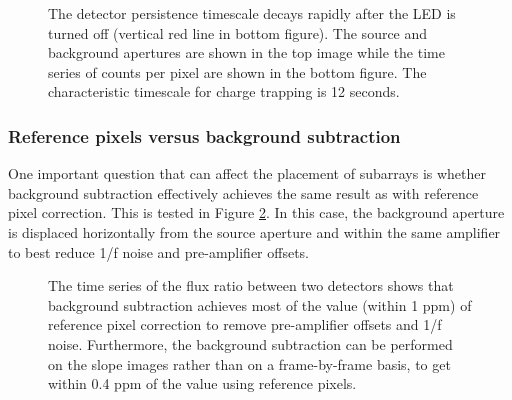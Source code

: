 \documentclass{aastex62}
\begin{document}
\begin{figure}
{}
{}
\caption{The detector persistence timescale decays rapidly after the LED is turned off (vertical red line in bottom figure).
The source and background apertures are shown in the top image while the time series of counts per pixel are shown in the bottom figure.
The characteristic timescale for charge trapping is 12 seconds.}\label{fig:persistence}
\end{figure}


\clearpage
\subsubsection{Reference pixels versus background subtraction}
One important question that can affect the placement of subarrays is whether background subtraction effectively achieves the same result as with reference pixel correction.
This is tested in Figure \ref{fig:BackgVsRefpix}.
In this case, the background aperture is displaced horizontally from the source aperture and within the same amplifier to best reduce 1/f noise and pre-amplifier offsets.


\begin{figure}
{}
{}
{}
\caption{The time series of the flux ratio between two detectors shows that background subtraction achieves most of the value (within 1 ppm) of reference pixel correction to remove pre-amplifier offsets and 1/f noise.
Furthermore, the background subtraction can be performed on the slope images rather than on a frame-by-frame basis, to get within 0.4 ppm of the value using reference pixels.
}\label{fig:BackgVsRefpix}
\end{figure}
\end{document}
